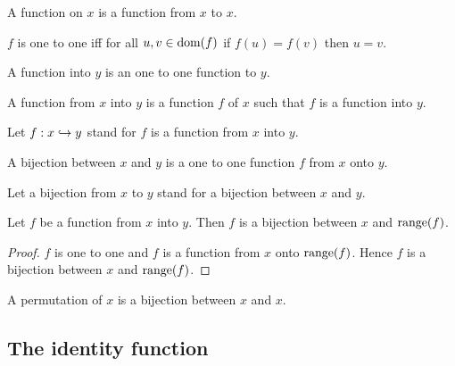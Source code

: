 \documentclass[../../set-theory.ftl.tex]{subfiles}
\begin{document}
\begin{forthel}
    \begin{definition}
      A function on $x$ is a function from $x$ to $x$.
    \end{definition}

    \begin{definition}
      $f$ is one to one iff for all $u,v \in \operatorname{dom}(f)$ if $f(u) = f(v)$ then $u = v$.
    \end{definition}

    \begin{definition}
      A function into $y$ is an one to one function to $y$.
    \end{definition}

    \begin{definition}
      A function from $x$ into $y$ is a function $f$ of $x$ such that $f$ is a function into $y$.
    \end{definition}

    Let $f: x \hookrightarrow y$ stand for $f$ is a function from $x$ into $y$.

    \begin{definition}
      A bijection between $x$ and $y$ is a one to one function $f$ from $x$ onto $y$.
    \end{definition}

    Let a bijection from $x$ to $y$ stand for a bijection between $x$ and $y$.

    \begin{proposition}\label{SetTheory_02_01_717927}
      Let $f$ be a function from $x$ into $y$.
      Then $f$ is a bijection between $x$ and $\operatorname{range}(f)$.
    \end{proposition}
    \begin{proof}
      $f$ is one to one and $f$ is a function from $x$ onto $\operatorname{range}(f)$.
      Hence $f$ is a bijection between $x$ and $\operatorname{range}(f)$.
    \end{proof}

    \begin{definition}
      A permutation of $x$ is a bijection between $x$ and $x$.
    \end{definition}
  \end{forthel}


  \subsection{The identity function}
\end{document}
